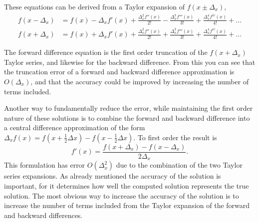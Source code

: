 These equations can be derived from a Taylor expansion of $f(x\pm\Delta_{x})$,
\begin{align}
f(x-\Delta_{x}) & = f(x)-\Delta_{x}f'(x)+\frac{\Delta_{x}^{2}f''(x)}{2!}-\frac{\Delta_{x}^{3}f'''(x)}{3!}+\frac{\Delta_{x}^{4}f^{iv}(x)}{4!}+...\label{eq:TaylorForward}\\
f(x+\Delta_{x}) & = f(x)+\Delta_{x}f'(x)+\frac{\Delta_{x}^{2}f''(x)}{2!}+\frac{\Delta_{x}^{3}f'''(x)}{3!}+\frac{\Delta_{x}^{4}f^{iv}(x)}{4!}+...\label{eq:TaylorBackward}
\end{align}


The forward difference equation is the first order truncation of the $f(x+\Delta_{x})$ Taylor series, and likewise for the backward difference.
From this you can see that the truncation error of a forward and backward difference approximation is $O(\Delta_{x})$, and that the accuracy could be improved by increasing the number of terms included.

Another way to fundamentally reduce the error, while maintaining the first order nature of these solutions is to combine the forward and backward difference into a central difference approximation of the form 
$\Delta_{x}f(x)=f(x+\frac{1}{2}\Delta x)-f(x-\frac{1}{2}\Delta x)$.
To first order the result is 
\begin{equation}
f'(x)=\frac{f(x+\Delta_{x})-f(x-\Delta_{x})}{2\Delta_{x}}.\label{eq:First Order CD}
\end{equation}
This formulation has error $O(\Delta_{x}^{2})$ due to the combination of the two Taylor series expansions.
As already mentioned the accuracy of the solution is important, for it determines how well the computed solution represents the true solution.
The most obvious way to increase the accuracy of the solution is to increase the number of terms included from the Taylor expansion of the forward and backward differences.

